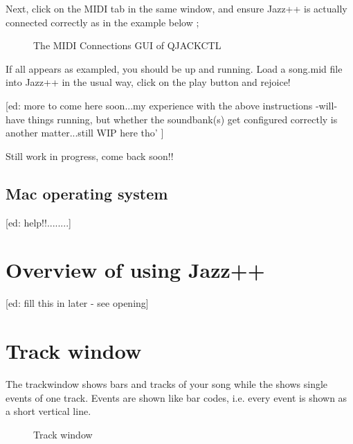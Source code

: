 \documentclass[letterpaper]{report}
\begin{document}
Next, click on the MIDI tab in the same window, and ensure Jazz++ is
actually connected correctly as in the example below ;



\begin{figure}%
% 
%
\caption{The MIDI Connections GUI of QJACKCTL}%
\end{figure}



If all appears as exampled, you should be up and running. Load a song.mid
file into Jazz++ in the usual way, click on the play button and rejoice!



[ed: more to come here soon...my experience with the above instructions
-will- have things running, but whether the soundbank(s) get configured
correctly is another matter...still WIP here tho' ]


Still work in progress, come back soon!!



\section{Mac operating system}

[ed: help!!........]



\chapter{Overview of using Jazz++}\label{jazzwin}

[ed: fill this in later - see opening]

\chapter{Track window}\label{trackwin}

The trackwindow shows bars and tracks of your song while the
 shows single events of one track. Events are shown like
bar codes, i.e. every event is shown as a short vertical line.

\begin{figure}%
%
%
\caption{Track window}%
\end{figure}
\end{document}

